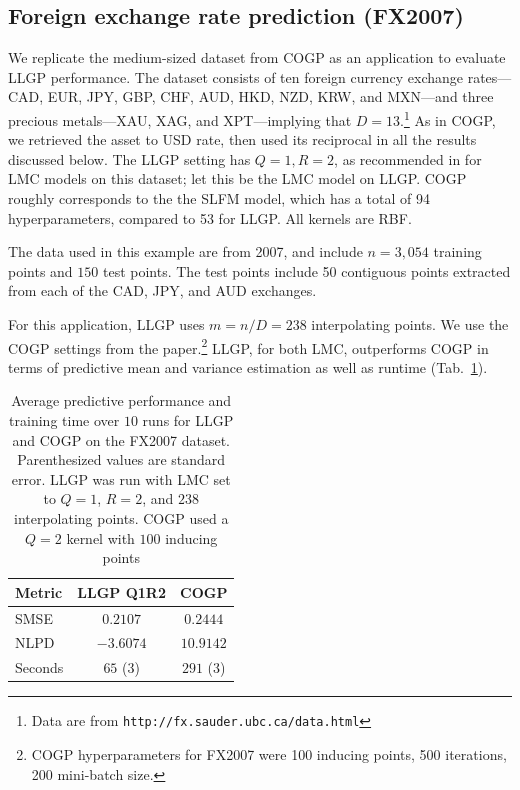 \documentclass{article}
\begin{document}
\subsection{Foreign exchange rate prediction (FX2007)}\label{fx2007-results}

We replicate the medium-sized dataset from COGP as an application to evaluate LLGP performance. The dataset consists of ten foreign currency exchange rates---CAD, EUR, JPY, GBP, CHF, AUD, HKD, NZD, KRW, and MXN---and three precious metals---XAU, XAG, and XPT---implying that $D=13$.\footnote{Data are from \texttt{http://fx.sauder.ubc.ca/data.html}} As in COGP, we retrieved the asset to USD rate, then used its reciprocal in all the results discussed below. The LLGP setting has $Q=1,R=2$, as recommended in \cite{alvarez2010efficient} for LMC models on this dataset; let this be the LMC model on LLGP. COGP roughly corresponds to the the SLFM model, which has a total of 94 hyperparameters, compared to 53 for LLGP. All kernels are RBF.

The data used in this example are from 2007, and include $n=3,054$ training points and $150$ test points. The test points include 50 contiguous points extracted from each of the CAD, JPY, and AUD exchanges.

For this application, LLGP uses $m=n/D=238$ interpolating points. We use the COGP settings from the paper.\footnote{COGP hyperparameters for FX2007 were 100 inducing points, 500 iterations, 200 mini-batch size.} LLGP, for both LMC, outperforms COGP in terms of predictive mean and variance estimation as well as runtime (Tab.~\ref{fx2007-tbl}).

\begin{table}[!ht]
  \caption{Average predictive performance and training time over $10$ runs for LLGP and COGP on the FX2007 dataset. Parenthesized values are standard error. LLGP was run with LMC set to $Q=1$, $R=2$, and $238$ interpolating points. COGP used a $Q=2$ kernel with $100$ inducing points}
\label{fx2007-tbl}
\vskip 0.15in
\begin{center}
\begin{small}
\begin{sc}
\begin{tabular}{|l|cc|}
\hline
  \abovespace\belowspace
  Metric & LLGP Q1R2 & COGP\\
\hline
\abovespace
  SMSE & $0.2107$ & $0.2444$ \\
  NLPD & $-3.6074$ & $10.9142$ \\
  Seconds & $65$ ($3$) & $291$ ($3$)
\belowspace\\
\hline
\end{tabular}
\end{sc}
\end{small}
\end{center}
\vskip -0.1in
\end{table}
\end{document}
